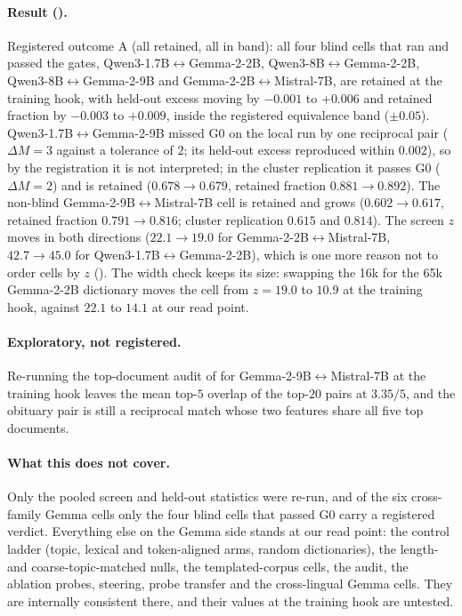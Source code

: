 \paragraph{Result ().} Registered outcome A (all retained, all in band): all four
blind cells that ran and passed the gates, Qwen3-1.7B$\leftrightarrow$Gemma-2-2B, Qwen3-8B$\leftrightarrow$Gemma-2-2B,
Qwen3-8B$\leftrightarrow$Gemma-2-9B and Gemma-2-2B$\leftrightarrow$Mistral-7B, are retained at the
training hook, with held-out excess moving by $-0.001$ to $+0.006$ and retained fraction by $-0.003$
to $+0.009$, inside the registered equivalence band ($\pm0.05$). Qwen3-1.7B$\leftrightarrow$Gemma-2-9B
missed G0 on the local run by one reciprocal pair ($\Delta M=3$ against a tolerance of $2$; its held-out
excess reproduced within $0.002$), so by the
registration it is not interpreted; in the cluster replication it passes G0 ($\Delta M=2$) and is
retained ($0.678\to0.679$, retained fraction $0.881\to0.892$). The non-blind
Gemma-2-9B$\leftrightarrow$Mistral-7B cell is retained and grows ($0.602\to0.617$, retained fraction
$0.791\to0.816$; cluster replication $0.615$ and $0.814$). The screen $z$ moves in both directions ($22.1\to19.0$ for
Gemma-2-2B$\leftrightarrow$Mistral-7B, $42.7\to45.0$ for Qwen3-1.7B$\leftrightarrow$Gemma-2-2B), which
is one more reason not to order cells by $z$ (). The width check keeps its
size: swapping the 16k for the 65k Gemma-2-2B dictionary moves the cell from $z=19.0$ to $10.9$ at
the training hook, against $22.1$ to $14.1$ at our read point.

\paragraph{Exploratory, not registered.} Re-running the top-document audit of
 for Gemma-2-9B$\leftrightarrow$Mistral-7B at the training hook leaves the
mean top-$5$ overlap of the top-$20$ pairs at $3.35/5$, and the obituary pair is still a reciprocal
match whose two features share all five top documents.

\paragraph{What this does not cover.} Only the pooled screen and held-out statistics were re-run,
and of the six cross-family Gemma cells only the four blind cells that passed G0 carry a registered
verdict. Everything else on the Gemma side stands at our read point: the control ladder (topic,
lexical and token-aligned arms, random dictionaries), the length- and coarse-topic-matched nulls,
the templated-corpus cells, the \citeauthor{lan2024universal} audit, the ablation probes, steering,
probe transfer and the cross-lingual Gemma cells. They are internally consistent there, and their
values at the training hook are untested.

